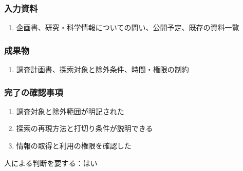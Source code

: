 \documentclass[a4paper,11pt]{article}
\begin{document}
\subsubsection*{入力資料}
\begin{enumerate}[leftmargin=2em,itemsep=0.35em]
\item 企画書、研究・科学情報についての問い、公開予定、既存の資料一覧
\end{enumerate}
\subsubsection*{成果物}
\begin{enumerate}[leftmargin=2em,itemsep=0.35em]
\item 調査計画書、探索対象と除外条件、時間・権限の制約
\end{enumerate}
\subsubsection*{完了の確認事項}
\begin{enumerate}[leftmargin=2em,itemsep=0.35em]
\item 調査対象と除外範囲が明記された
\item 探索の再現方法と打切り条件が説明できる
\item 情報の取得と利用の権限を確認した
\end{enumerate}
\par 人による判断を要する：はい\par\medskip
\end{document}
